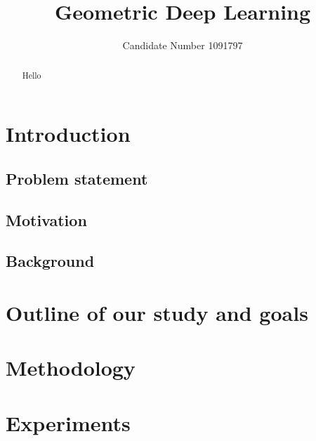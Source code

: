\documentclass{article}
\title{Geometric Deep Learning}
\author{Candidate Number 1091797}
\begin{document}
\maketitle

\begin{abstract}
    Hello
\end{abstract}

\section{Introduction}
\subsection{Problem statement}
\subsection{Motivation}
\subsection{Background}

\section{Outline of our study and goals}


\section{Methodology}


\section{Experiments}

\end{document}
